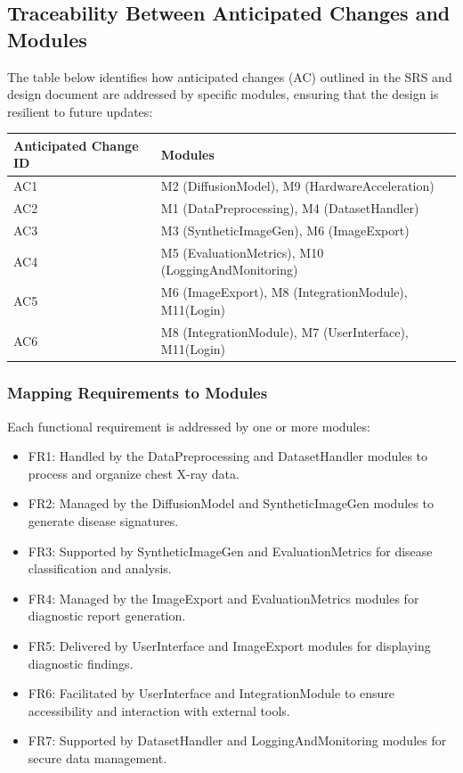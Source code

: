 \documentclass[12pt, titlepage]{article}
\begin{document}
\subsection{Traceability Between Anticipated Changes and Modules}
The table below identifies how anticipated changes (AC) outlined in the SRS and design document are addressed by specific modules, ensuring that the design is resilient to future updates:

\begin{table}[H]
  \begin{tabular}{l|l}
  \textbf{Anticipated Change ID} & \textbf{Modules} \\
  \hline
  AC1 & M2 (DiffusionModel), M9 (HardwareAcceleration) \\
  AC2 & M1 (DataPreprocessing), M4 (DatasetHandler) \\
  AC3 & M3 (SyntheticImageGen), M6 (ImageExport) \\
  AC4 & M5 (EvaluationMetrics), M10 (LoggingAndMonitoring) \\
  AC5 & M6 (ImageExport), M8 (IntegrationModule), M11(Login) \\
  AC6 & M8 (IntegrationModule), M7 (UserInterface), M11(Login)
  \end{tabular}
\end{table}


\subsubsection{Mapping Requirements to Modules}
Each functional requirement is addressed by one or more modules:
\begin{itemize}
\item FR1: Handled by the DataPreprocessing and DatasetHandler modules to process and organize chest X-ray data.
\item FR2: Managed by the DiffusionModel and SyntheticImageGen modules to generate disease signatures.
\item FR3: Supported by SyntheticImageGen and EvaluationMetrics for disease classification and analysis.
\item FR4: Managed by the ImageExport and EvaluationMetrics modules for diagnostic report generation.
\item FR5: Delivered by UserInterface and ImageExport modules for displaying diagnostic findings.
\item FR6: Facilitated by UserInterface and IntegrationModule to ensure accessibility and interaction with external tools.
\item FR7: Supported by DatasetHandler and LoggingAndMonitoring modules for secure data management.
\end{itemize}
\end{document}
